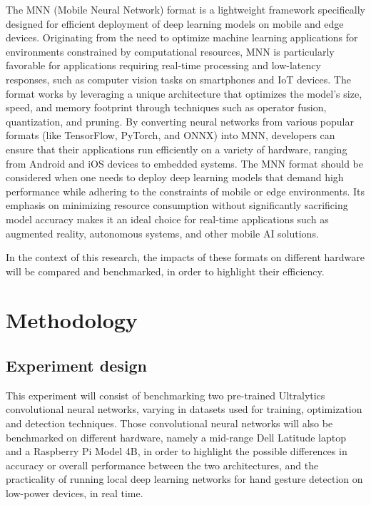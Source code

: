\documentclass[12pt]{article}
\begin{document}
The MNN (Mobile Neural Network) format is a lightweight framework specifically designed for efficient deployment of deep learning models on mobile and edge devices. Originating from the need to optimize machine learning applications for environments constrained by computational resources, MNN is particularly favorable for applications requiring real-time processing and low-latency responses, such as computer vision tasks on smartphones and IoT devices. The format works by leveraging a unique architecture that optimizes the model's size, speed, and memory footprint through techniques such as operator fusion, quantization, and pruning. By converting neural networks from various popular formats (like TensorFlow, PyTorch, and ONNX) into MNN, developers can ensure that their applications run efficiently on a variety of hardware, ranging from Android and iOS devices to embedded systems. The MNN format should be considered when one needs to deploy deep learning models that demand high performance while adhering to the constraints of mobile or edge environments. Its emphasis on minimizing resource consumption without significantly sacrificing model accuracy makes it an ideal choice for real-time applications such as augmented reality, autonomous systems, and other mobile AI solutions.

In the context of this research, the impacts of these formats on different hardware will be compared and benchmarked, in order to highlight their efficiency.

\section{Methodology}

\subsection{Experiment design}

This experiment will consist of benchmarking two pre-trained Ultralytics convolutional neural networks, varying in datasets used for training, optimization and detection techniques. Those convolutional neural networks will also be benchmarked on different hardware, namely a mid-range Dell Latitude laptop and a Raspberry Pi Model 4B, in order to highlight the possible differences in accuracy or overall performance between the two architectures, and the practicality of running local deep learning networks for hand gesture detection on low-power devices, in real time.
\end{document}
